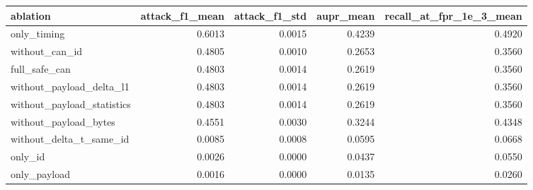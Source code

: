 \begin{tabular}{lrrrr}
\toprule
ablation & attack\_f1\_mean & attack\_f1\_std & aupr\_mean & recall\_at\_fpr\_1e\_3\_mean \\
\midrule
only\_timing & 0.6013 & 0.0015 & 0.4239 & 0.4920 \\
without\_can\_id & 0.4805 & 0.0010 & 0.2653 & 0.3560 \\
full\_safe\_can & 0.4803 & 0.0014 & 0.2619 & 0.3560 \\
without\_payload\_delta\_l1 & 0.4803 & 0.0014 & 0.2619 & 0.3560 \\
without\_payload\_statistics & 0.4803 & 0.0014 & 0.2619 & 0.3560 \\
without\_payload\_bytes & 0.4551 & 0.0030 & 0.3244 & 0.4348 \\
without\_delta\_t\_same\_id & 0.0085 & 0.0008 & 0.0595 & 0.0668 \\
only\_id & 0.0026 & 0.0000 & 0.0437 & 0.0550 \\
only\_payload & 0.0016 & 0.0000 & 0.0135 & 0.0260 \\
\bottomrule
\end{tabular}
